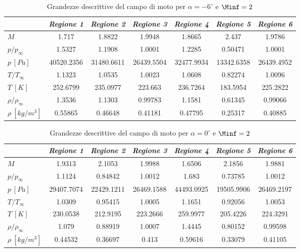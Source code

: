 \begin{table} [!h]
	\centering 
	\begin{tabular}{l  c  c c c c c}    
		\toprule&   
		 \emph{Regione 1}& \emph{Regione 2}& \emph{Regione 3}& \emph{Regione 4}& \emph{Regione 5}& \emph{Regione 6}   \\  \midrule$M$ &1.717 &1.8822 &1.9948 &1.8665 &2.437 &1.9786 \\
		 $p/p_{\infty}$ &1.5327 &1.1908 &1.0001 &1.2285 &0.50471 &1.0001 \\
		 $p \ [\si{Pa}]$ &40520.2356 &31480.6611 &26439.5504 &32477.9934 &13342.6358 &26439.4952 \\
		 $T/T_{\infty}$ &1.1323&1.0535&1.0023&1.0608&0.82274&1.0096\\
		 $T \ [K]$ &252.6799&235.0977&223.663&236.7264&183.5954&225.2822\\
		 $\rho/\rho_{\infty}$ &1.3536&1.1303&0.99783&1.1581&0.61345&0.99066\\
		 $\rho \ [kg/m^3]$ &0.55865&0.46648&0.41181&0.47795&0.25317&0.40885\\
		 \bottomrule\end{tabular}
		\caption {\footnotesize Grandezze descrittive del campo di moto per $\alpha=-6^\circ$ e $\Minf=2$}\label{tabS9}
		\end{table}			
		
		\begin{table} [!h]\centering {}\begin{tabular}{l  c  c c c c c}    \toprule&    \emph{Regione 1}& \emph{Regione 2}& \emph{Regione 3}& \emph{Regione 4}& \emph{Regione 5}& \emph{Regione 6}   \\  \midrule$M$ &1.9313 &2.1053 &1.9988 &1.6506 &2.1856 &1.9881 \\$p/p_{\infty}$ &1.1124 &0.84842 &1.0012 &1.683 &0.73785 &1.0012 \\$p \ [\si{Pa}]$ &29407.7074 &22429.1211 &26469.1588 &44493.0925 &19505.9906 &26469.2197 \\$T/T_{\infty}$ &1.0309&0.95415&1.0005&1.1651&0.92056&1.0053\\$T \ [K]$ &230.0538&212.9195&223.2666&259.9977&205.4226&224.3291\\$\rho/\rho_{\infty}$ &1.079&0.88919&1.0007&1.4445&0.80152&0.99598\\$\rho \ [kg/m^3]$ &0.44532&0.36697&0.413&0.59616&0.33079&0.41105\\\bottomrule\end{tabular}\caption {\footnotesize Grandezze descrittive del campo di moto per $\alpha=0^\circ$ e $\Minf=2$}\label{tabS10}\end{table}				
		
